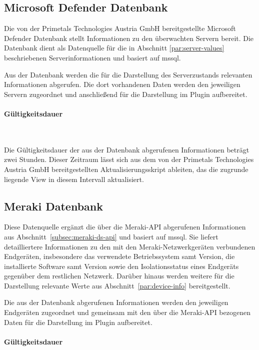 \subsection{Microsoft Defender Datenbank}
\label{subsec:microsoft-defender-ds}

Die von der Primetals Technologies Austria GmbH bereitgestellte Microsoft Defender
Datenbank stellt Informationen zu den überwachten Servern bereit. Die
Datenbank dient als Datenquelle für die in Abschnitt
\ref{par:server-values} beschriebenen Serverinformationen und basiert auf
\gls{mssql}.

Aus der Datenbank werden die für die Darstellung des Serverzustands
relevanten Informationen abgerufen. Die dort vorhandenen Daten werden den
jeweiligen Servern zugeordnet und anschließend für die Darstellung im
Plugin aufbereitet.

\paragraph{Gültigkeitsdauer}
\label{par:defender-validation-time}

~

Die Gültigkeitsdauer der aus der Datenbank abgerufenen Informationen beträgt
zwei Stunden. Dieser Zeitraum lässt sich aus dem von der Primetals Technologies
Austria GmbH bereitgestellten Aktualisierungsskript ableiten, das die
zugrunde liegende View in diesem Intervall aktualisiert.

\subsection{Meraki Datenbank}
\label{subsec:meraki-ds-db}

Diese Datenquelle ergänzt die über die Meraki-API abgerufenen Informationen
aus Abschnitt~\ref{subsec:meraki-ds-api} und basiert auf \gls{mssql}. Sie liefert
detailliertere Informationen zu den mit den Meraki-Netzwerkgeräten verbundenen
Endgeräten, insbesondere das verwendete Betriebssystem samt Version, die
installierte Software samt Version sowie den Isolationsstatus eines Endgeräts
gegenüber dem restlichen Netzwerk. Darüber hinaus werden weitere für die
Darstellung relevante Werte aus Abschnitt~\ref{par:device-info} bereitgestellt.

Die aus der Datenbank abgerufenen Informationen werden den jeweiligen
Endgeräten zugeordnet und gemeinsam mit den über die Meraki-API bezogenen
Daten für die Darstellung im Plugin aufbereitet.

\paragraph{Gültigkeitsdauer}
\label{par:meraki-db-validation-time}

